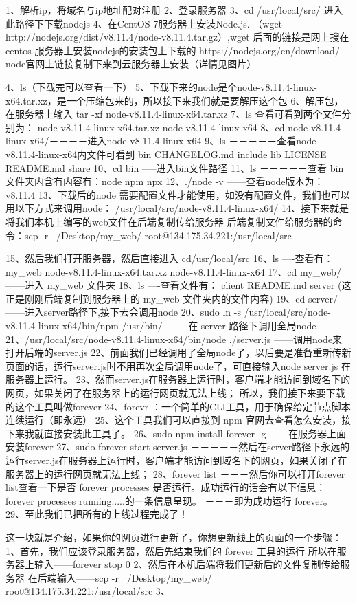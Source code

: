 1、解析ip，将域名与ip地址配对注册
2、登录服务器
3、cd /usr/local/src/  进入此路径下下载nodejs
4、在CentOS 7服务器上安装Node.js.
（wget http://nodejs.org/dist/v8.11.4/node-v8.11.4.tar.gz）,wget 后面的链接是网上搜在centos 服务器上安装nodejs的安装包上下载的
https://nodejs.org/en/download/   node官网上链接复制下来到云服务器上安装（详情见图片）

4、ls（下载完可以查看一下）
5、下载下来的node是个node-v8.11.4-linux-x64.tar.xz，是一个压缩包来的，所以接下来我们就是要解压这个包
6、解压包，在服务器上输入  tar -xf node-v8.11.4-linux-x64.tar.xz
7、ls 查看可看到两个文件分别为：
    node-v8.11.4-linux-x64.tar.xz       node-v8.11.4-linux-x64
8、cd node-v8.11.4-linux-x64/－－－－进入node-v8.11.4-linux-x64
9、ls －－－－－查看node-v8.11.4-linux-x64内文件可看到 bin  CHANGELOG.md   include   lib   LICENSE  README.md  share
10、cd bin  -----进入bin文件路径
11、ls  －－－－－查看 bin 文件夹内含有内容有：node  npm  npx
12、./node -v   ------查看node版本为：v8.11.4
13、下载后的node 需要配置文件才能使用，如没有配置文件，我们也可以用以下方式来调用node：
    /usr/local/src/node-v8.11.4-linux-x64/
14、接下来就是将我们本机上编写的web文件在后端复制传给服务器
    后端复制文件给服务器的命令：scp -r ~/Desktop/my_web/ root@134.175.34.221:/usr/local/src

15、然后我们打开服务器，然后直接进入 cd/usr/local/src
16、ls  ----查看有：
    my_web   node-v8.11.4-linux-x64.tar.xz       node-v8.11.4-linux-x64
17、cd my_web/   ------进入 my_web 文件夹
18、ls   ----查看文件有：
    client README.md  server   (这正是刚刚后端复制到服务器上的 my_web 文件夹内的文件内容)
19、cd server/    ------进入server路径下,接下去会调用node
20、sudo ln -s /usr/local/src/node-v8.11.4-linux-x64/bin/npm /usr/bin/     -------在 server 路径下调用全局node
21、/usr/local/src/node-v8.11.4-linux-x64/bin/node ./server.js       ------调用node来打开后端的server.js
22、前面我们已经调用了全局node了，以后要是准备重新传新页面的话，运行server.js时不用再次全局调用node了，可直接输入node server.js 在服务器上运行。
23、然而server.js在服务器上运行时，客户端才能访问到域名下的网页，如果关闭了在服务器上的运行网页就无法上线；
    所以，我们接下来要下载的这个工具叫做forever
24、forevr ：一个简单的CLI工具，用于确保给定节点脚本连续运行（即永远）
25、这个工具我们可以直接到 npm 官网去查看怎么安装，接下来我就直接安装此工具了。
26、sudo npm install forever -g    ------在服务器上面安装forever
27、sudo forever start server.js   －－－－－然后在server路径下永远的运行server.js在服务器上运行时，客户端才能访问到域名下的网页，如果关闭了在服务器上的运行网页就无法上线；
28、forever list        
－－－然后你可以打开forever list查看一下是否 forever processes 是否运行。成功运行的话会有以下信息：forever processes running.....的一条信息呈现。
－－－即为成功运行 forever。
29、至此我们已把所有的上线过程完成了！

这一块就是介绍，如果你的网页进行更新了，你想更新线上的页面的一个步骤：
1、首先，我们应该登录服务器，然后先结束我们的 forever 工具的运行     所以在服务器上输入------forever stop 0
2、然后在本机后端将我们更新后的文件复制传给服务器            在后端输入------scp -r ~/Desktop/my_web/ root@134.175.34.221:/usr/local/src
3、

